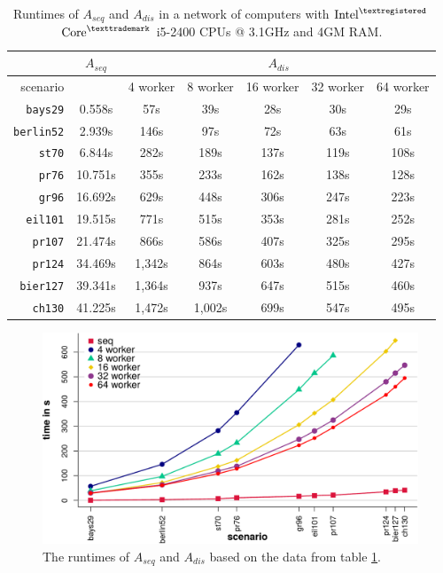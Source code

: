 \begin{table}[h!]
  \centering
  \begin{tabular}{r|c||c|c|c|c|c|}
    \cline{2-7}
    & \multicolumn{1}{c||}{$A_{seq}$} & \multicolumn{5}{c|}{$A_{dis}$} \\
    \hline
    \multicolumn{1}{|r||}{scenario} & & 4 worker & 8 worker & 16 worker & 32 worker & 64 worker \\
    \hline
    \hline
    \multicolumn{1}{|r||}{\texttt{bays29}} & 0.558s & 57s & 39s & 28s & 30s & 29s \\
    \hline
    \multicolumn{1}{|r||}{\texttt{berlin52}} & 2.939s & 146s & 97s & 72s & 63s & 61s \\
    \hline
    \multicolumn{1}{|r||}{\texttt{st70}} & 6.844s & 282s & 189s & 137s & 119s & 108s \\
    \hline
    \multicolumn{1}{|r||}{\texttt{pr76}} & 10.751s & 355s & 233s & 162s & 138s & 128s \\
    \hline
    \multicolumn{1}{|r||}{\texttt{gr96}} & 16.692s & 629s & 448s & 306s & 247s & 223s \\
    \hline
    \multicolumn{1}{|r||}{\texttt{eil101}} & 19.515s & 771s & 515s & 353s & 281s & 252s \\
    \hline
    \multicolumn{1}{|r||}{\texttt{pr107}} & 21.474s & 866s & 586s & 407s & 325s & 295s \\
    \hline
    \multicolumn{1}{|r||}{\texttt{pr124}} & 34.469s & 1,342s & 864s & 603s & 480s & 427s \\
    \hline
    \multicolumn{1}{|r||}{\texttt{bier127}} & 39.341s & 1,364s & 937s & 647s & 515s & 460s \\
    \hline
    \multicolumn{1}{|r||}{\texttt{ch130}} & 41.225s & 1,472s & 1,002s & 699s & 547s & 495s \\
    \hline
  \end{tabular}
  \caption{Runtimes of $A_{seq}$ and $A_{dis}$ in a network of computers with $\text{Intel}^{\textregistered}$ $\text{Core}^{\texttrademark}$ i5-2400 CPUs @ 3.1GHz and 4GM RAM.}
  \vspace*{-0.75em}
  \label{tbl:test2}
\end{table}

\begin{figure}[h!]
  \centering
  \includegraphics[width=\textwidth]{img/test_distributed.pdf}
  \caption{The runtimes of $A_{seq}$ and $A_{dis}$ based on the data from table \ref{tbl:test2}.}
  \label{fig:test2}
\end{figure}

